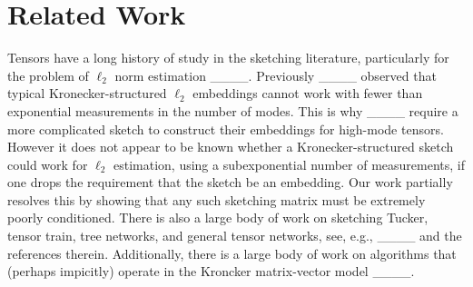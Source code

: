 \section{Related Work}
Tensors have a long history of study in the sketching literature, particularly for the problem of $\ell_2$ norm estimation ____.
Previously ____ observed that typical Kronecker-structured $\ell_2$ embeddings cannot work with fewer than exponential measurements in the number of modes.
This is why ____ require a more complicated sketch to construct their embeddings for high-mode tensors.
However it does not appear to be known whether a  Kronecker-structured sketch could work for $\ell_2$ estimation, using a subexponential number of measurements, if one drops the requirement that the sketch be an embedding.
Our work partially resolves this by showing that any such sketching matrix must be extremely poorly conditioned.
There is also a large body of work on sketching Tucker, tensor train, tree networks, and general tensor networks, see, e.g., ____ and the references therein.
Additionally, there is a large body of work on algorithms that (perhaps impicitly) operate in the Kroncker matrix-vector model ____.